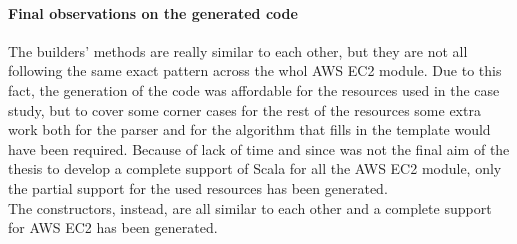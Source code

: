 \paragraph{Final observations on the generated code}
The builders' methods are really similar to each other, but they are not all following the same exact pattern across the whol AWS EC2 module.
Due to this fact, the generation of the code was affordable for the resources used in the case study, but to cover some corner cases for the rest of the resources some extra work both for the parser and for the algorithm that fills in the template would have been required.
Because of lack of time and since was not the final aim of the thesis to develop a complete support of Scala for all the AWS EC2 module, only the partial support for the used resources has been generated.\\
The constructors, instead, are all similar to each other and a complete support for AWS EC2 has been generated.